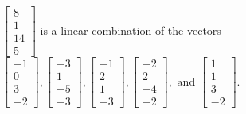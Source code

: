 \begin{exercise}
\begin{exerciseStatement}
  \end{exerciseStatement}
  \begin{exerciseAnswer}
   \(\left[\begin{array}{c}
8 \\
1 \\
14 \\
5
\end{array}\right]\) 
  	 is  
	a linear combination of the vectors \(\left[\begin{array}{c}
-1 \\
0 \\
3 \\
-2
\end{array}\right] , \left[\begin{array}{c}
-3 \\
1 \\
-5 \\
-3
\end{array}\right] , \left[\begin{array}{c}
-1 \\
2 \\
1 \\
-3
\end{array}\right] , \left[\begin{array}{c}
-2 \\
2 \\
-4 \\
-2
\end{array}\right] , \text{ and } \left[\begin{array}{c}
1 \\
1 \\
3 \\
-2
\end{array}\right]\).

	
  


  \end{exerciseAnswer}
\end{exercise}